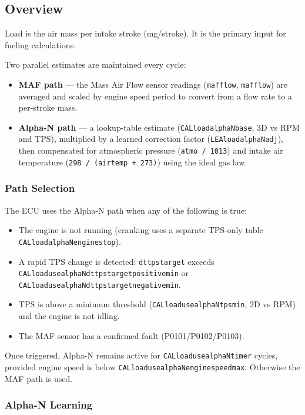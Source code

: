 \documentclass[a4paper,11pt]{article}
\renewcommand{\_}{\oldunderscore\allowbreak}
\begin{document}
\subsection{Overview}

Load is the air mass per intake stroke (mg/stroke). It is the primary input
for fueling calculations.

Two parallel estimates are maintained every cycle:
\begin{itemize}
\item \textbf{MAF path} --- the Mass Air Flow sensor readings
      (\texttt{maf\_flow\_1}, \texttt{maf\_flow\_2}) are averaged and scaled by
      engine speed period to convert from a flow rate to a per-stroke mass.
\item \textbf{Alpha-N path} --- a lookup-table estimate
      (\texttt{CAL\_load\_alphaN\_base}, 3D vs RPM and TPS), multiplied by
      a learned correction factor (\texttt{LEA\_load\_alphaN\_adj}), then
      compensated for atmospheric pressure (\texttt{atmo / 1013}) and intake
      air temperature (\texttt{298 / (air\_temp + 273)}) using the ideal gas
      law.
\end{itemize}

\subsubsection*{Path Selection}

The ECU uses the Alpha-N path when any of the following is true:
\begin{itemize}
\item The engine is not running (cranking uses a separate TPS-only table
      \texttt{CAL\_load\_alphaN\_engine\_stop}).
\item A rapid TPS change is detected: \texttt{dt\_tps\_target\_1} exceeds
      \texttt{CAL\_load\_use\_alphaN\_dt\_tps\_target\_1\_positive\_min} or
      \texttt{CAL\_load\_use\_alphaN\_dt\_tps\_target\_1\_negative\_min}.
\item TPS is above a minimum threshold
      (\texttt{CAL\_load\_use\_alphaN\_tps\_min}, 2D vs RPM) and the
      engine is not idling.
\item The MAF sensor has a confirmed fault (P0101/P0102/P0103).
\end{itemize}
Once triggered, Alpha-N remains active for
\texttt{CAL\_load\_use\_alphaN\_timer} cycles, provided engine speed is below
\texttt{CAL\_load\_use\_alphaN\_engine\_speed\_max}. Otherwise the MAF path is
used.

\subsubsection*{Alpha-N Learning}
\end{document}
